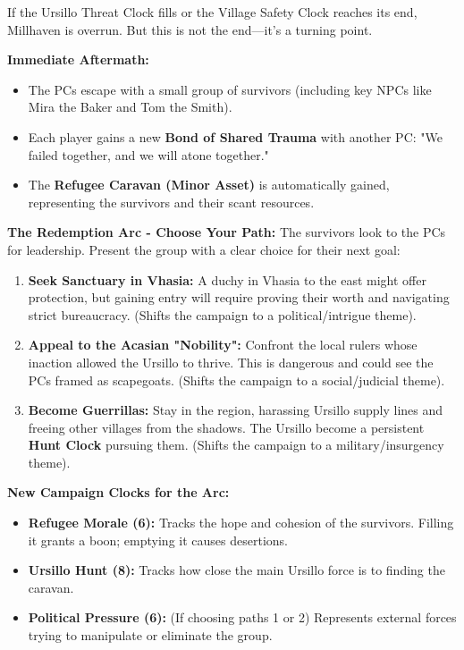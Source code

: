 \documentclass[11pt]{article}
\begin{document}
If the Ursillo Threat Clock fills or the Village Safety Clock reaches its end, Millhaven is overrun. But this is not the end—it's a turning point.

\textbf{Immediate Aftermath:}
\begin{itemize}
\item The PCs escape with a small group of survivors (including key NPCs like Mira the Baker and Tom the Smith).
\item Each player gains a new \textbf{Bond of Shared Trauma} with another PC: "We failed together, and we will atone together."
\item The \textbf{Refugee Caravan (Minor Asset)} is automatically gained, representing the survivors and their scant resources.
\end{itemize}

\textbf{The Redemption Arc - Choose Your Path:}
The survivors look to the PCs for leadership. Present the group with a clear choice for their next goal:

\begin{enumerate}
\item \textbf{Seek Sanctuary in Vhasia:} A duchy in Vhasia to the east might offer protection, but gaining entry will require proving their worth and navigating strict bureaucracy. (Shifts the campaign to a political/intrigue theme).
\item \textbf{Appeal to the Acasian "Nobility":} Confront the local rulers whose inaction allowed the Ursillo to thrive. This is dangerous and could see the PCs framed as scapegoats. (Shifts the campaign to a social/judicial theme).
\item \textbf{Become Guerrillas:} Stay in the region, harassing Ursillo supply lines and freeing other villages from the shadows. The Ursillo become a persistent \textbf{Hunt Clock} pursuing them. (Shifts the campaign to a military/insurgency theme).
\end{enumerate}

\textbf{New Campaign Clocks for the Arc:}
\begin{itemize}
\item \textbf{Refugee Morale (6):} Tracks the hope and cohesion of the survivors. Filling it grants a boon; emptying it causes desertions.
\item \textbf{Ursillo Hunt (8):} Tracks how close the main Ursillo force is to finding the caravan.
\item \textbf{Political Pressure (6):} (If choosing paths 1 or 2) Represents external forces trying to manipulate or eliminate the group.
\end{itemize}
\end{document}
